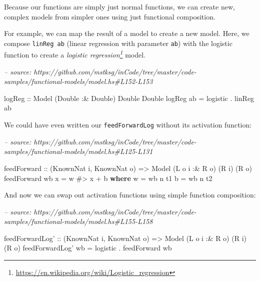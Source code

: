 \documentclass[]{article}
\newenvironment{Shaded}{}{}
\newcommand{\CommentTok}[1]{\textcolor[rgb]{0.38,0.63,0.69}{\textit{#1}}}
\newcommand{\DataTypeTok}[1]{\textcolor[rgb]{0.56,0.13,0.00}{#1}}
\newcommand{\FunctionTok}[1]{\textcolor[rgb]{0.02,0.16,0.49}{#1}}
\newcommand{\KeywordTok}[1]{\textcolor[rgb]{0.00,0.44,0.13}{\textbf{#1}}}
\newcommand{\NormalTok}[1]{#1}
\newcommand{\OtherTok}[1]{\textcolor[rgb]{0.00,0.44,0.13}{#1}}
\renewcommand{\href}[2]{#2\footnote{\url{#1}}}
\begin{document}
Because our functions are simply just normal functions, we can create new,
complex models from simpler ones using just functional composition.

For example, we can map the result of a model to create a new model. Here, we
compose \texttt{linReg\ ab} (linear regression with parameter \texttt{ab}) with
the logistic function to create a
\emph{\href{https://en.wikipedia.org/wiki/Logistic_regression}{logistic
regression}} model.

\begin{Shaded}
\begin{Highlighting}[]
\CommentTok{-- source: https://github.com/mstksg/inCode/tree/master/code-samples/functional-models/model.hs#L152-L153}

\OtherTok{logReg ::} \DataTypeTok{Model}\NormalTok{ (}\DataTypeTok{Double} \FunctionTok{:&} \DataTypeTok{Double}\NormalTok{) }\DataTypeTok{Double} \DataTypeTok{Double}
\NormalTok{logReg ab }\FunctionTok{=}\NormalTok{ logistic }\FunctionTok{.}\NormalTok{ linReg ab}
\end{Highlighting}
\end{Shaded}

We could have even written our \texttt{feedForwardLog} without its activation
function:

\begin{Shaded}
\begin{Highlighting}[]
\CommentTok{-- source: https://github.com/mstksg/inCode/tree/master/code-samples/functional-models/model.hs#L125-L131}

\NormalTok{feedForward}
\OtherTok{    ::}\NormalTok{ (}\DataTypeTok{KnownNat}\NormalTok{ i, }\DataTypeTok{KnownNat}\NormalTok{ o)}
    \OtherTok{=>} \DataTypeTok{Model}\NormalTok{ (}\DataTypeTok{L}\NormalTok{ o i }\FunctionTok{:&} \DataTypeTok{R}\NormalTok{ o) (}\DataTypeTok{R}\NormalTok{ i) (}\DataTypeTok{R}\NormalTok{ o)}
\NormalTok{feedForward wb x }\FunctionTok{=}\NormalTok{ w }\FunctionTok{#>}\NormalTok{ x }\FunctionTok{+}\NormalTok{ b}
  \KeywordTok{where}
\NormalTok{    w }\FunctionTok{=}\NormalTok{ wb }\FunctionTok{^^.}\NormalTok{ t1}
\NormalTok{    b }\FunctionTok{=}\NormalTok{ wb }\FunctionTok{^^.}\NormalTok{ t2}
\end{Highlighting}
\end{Shaded}

And now we can swap out activation functions using simple function composition:

\begin{Shaded}
\begin{Highlighting}[]
\CommentTok{-- source: https://github.com/mstksg/inCode/tree/master/code-samples/functional-models/model.hs#L155-L158}

\NormalTok{feedForwardLog'}
\OtherTok{    ::}\NormalTok{ (}\DataTypeTok{KnownNat}\NormalTok{ i, }\DataTypeTok{KnownNat}\NormalTok{ o)}
    \OtherTok{=>} \DataTypeTok{Model}\NormalTok{ (}\DataTypeTok{L}\NormalTok{ o i }\FunctionTok{:&} \DataTypeTok{R}\NormalTok{ o) (}\DataTypeTok{R}\NormalTok{ i) (}\DataTypeTok{R}\NormalTok{ o)}
\NormalTok{feedForwardLog' wb }\FunctionTok{=}\NormalTok{ logistic }\FunctionTok{.}\NormalTok{ feedForward wb}
\end{Highlighting}
\end{Shaded}
\end{document}
